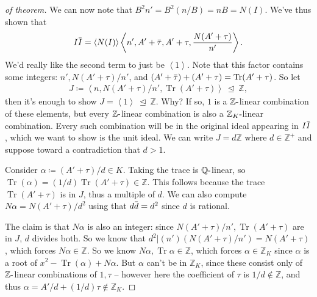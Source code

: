 \begin{proof}[of theorem]
We can now note that \(B^2 n' = B^2(n/B) = nB = N(I)\). We've thus shown
that
\begin{align*}
I \mkern 1.5mu\overline{\mkern-1.5muI\mkern-1.5mu}\mkern 1.5mu 
= \left\langle{ N(I) }\right\rangle 
\left\langle{ n', A' + \mkern 1.5mu\overline{\mkern-1.5mu \tau\mkern-1.5mu}\mkern 1.5mu , A' + \tau, { N(A' + \tau) \over  n'} }\right\rangle   
.\end{align*}
We'd really like the second term to just be
\(\left\langle{ 1 }\right\rangle\). Note that this factor contains some
integers: \(n', N(A' + \tau)/n'\), and
\((A' + \mkern 1.5mu\overline{\mkern-1.5mu\tau\mkern-1.5mu}\mkern 1.5mu) + (A' + \tau) = \operatorname{Tr}(A' + \tau)\).
So let
\begin{align*}
J \coloneqq\left\langle{ n, N(A' + \tau)/n', \operatorname{Tr}(A' + \tau) }\right\rangle {~\trianglelefteq~}{\mathbb{Z}}
,\end{align*}
then it's enough to show
\(J = \left\langle{ 1 }\right\rangle {~\trianglelefteq~}{\mathbb{Z}}\).
Why? If so, \(1\) is a \({\mathbb{Z}}{\hbox{-}}\)linear combination of
these elements, but every \({\mathbb{Z}}{\hbox{-}}\)linear combination
is also a \({\mathbb{Z}}_K{\hbox{-}}\)linear combination. Every such
combination will be in the original ideal appearing in
\(I \mkern 1.5mu\overline{\mkern-1.5muI\mkern-1.5mu}\mkern 1.5mu\),
which we want to show is the unit ideal. We can write
\(J = d{\mathbb{Z}}\) where \(d\in {\mathbb{Z}}^+\) and suppose toward a
contradiction that \(d>1\).

\hfill\break

Consider \(\alpha \coloneqq(A' + \tau) / d \in K\). Taking the trace is
\({\mathbb{Q}}{\hbox{-}}\)linear, so
\(\operatorname{Tr}( \alpha) = (1/d) \operatorname{Tr}(A' + \tau) \in {\mathbb{Z}}\).
This follows because the trace \(\operatorname{Tr}(A' + \tau)\) is in
\(J\), thus a multiple of \(d\). We can also compute
\(N \alpha = N(A' + \tau) / d^2\) using that
\(d\mkern 1.5mu\overline{\mkern-1.5mud\mkern-1.5mu}\mkern 1.5mu = d^2\)
since \(d\) is rational.

\hfill\break

The claim is that \(N \alpha\) is also an integer: since
\(N(A' + \tau)/n', \operatorname{Tr}(A' + \tau)\) are in \(J\), \(d\)
divides both. So we know that
\(d^2 \mathrel{\Big|}(n') (N(A' + \tau) / n') = N(A' + \tau)\), which
forces \(N \alpha\in {\mathbb{Z}}\). So we know
\(N \alpha, \operatorname{Tr}\alpha \in {\mathbb{Z}}\), which forces
\(\alpha\in {\mathbb{Z}}_K\) since \(\alpha\) is a root of
\(x^2 - \operatorname{Tr}(\alpha) + N \alpha\). But \(\alpha\) can't be
in \({\mathbb{Z}}_K\), since these consist only of
\({\mathbb{Z}}{\hbox{-}}\)linear combinations of \(1, \tau\) -- however
here the coefficient of \(\tau\) is \(1/d \not \in {\mathbb{Z}}\), and
thus \(\alpha = A'/d + (1/d) \tau \not\in {\mathbb{Z}}_K\).

\end{proof}

